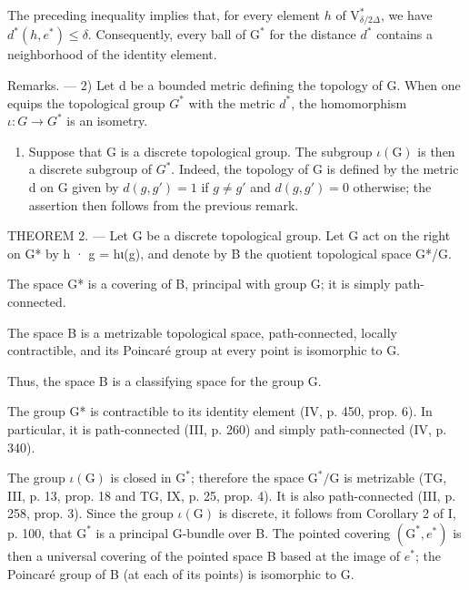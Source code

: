 The preceding inequality implies that, for every element \(h\) of \(\mathrm{V}_{\delta/2\Delta}^{*}\), we have \(d^{*}(h,e^{*})\leqslant\delta\). Consequently, every ball of \(\mathrm{G}^{*}\) for the distance \(d^{*}\) contains a neighborhood of the identity element.

Remarks. --- 2) Let d be a bounded metric defining the topology of G. When one equips the topological group \(G^{*}\) with the metric \(d^{*}\), the homomorphism \(\iota: G \to G^{*}\) is an isometry.

\begin{enumerate}
\def\labelenumi{\arabic{enumi})}
\setcounter{enumi}{2}
\tightlist
\item
  Suppose that G is a discrete topological group. The subgroup \(\iota(\mathrm{G})\) is then a discrete subgroup of \(G^{*}\). Indeed, the topology of G is defined by the metric d on G given by \(d(g,g') = 1\) if \(g \neq g'\) and \(d(g, g') = 0\) otherwise; the assertion then follows from the previous remark.
\end{enumerate}

THEOREM 2. --- Let G be a discrete topological group. Let G act on the right on G* by h · g = hι(g), and denote by B the quotient topological space G*/G.

The space G* is a covering of B, principal with group G; it is simply path-connected.

The space B is a metrizable topological space, path-connected, locally contractible, and its Poincaré group at every point is isomorphic to G.

Thus, the space B is a classifying space for the group G.

The group G* is contractible to its identity element (IV, p. 450, prop. 6). In particular, it is path-connected (III, p. 260) and simply path-connected (IV, p. 340).

The group \(\iota(\mathrm{G})\) is closed in \(\mathrm{G}^*\); therefore the space \(\mathrm{G}^*/\mathrm{G}\) is metrizable (TG, III, p. 13, prop. 18 and TG, IX, p. 25, prop. 4). It is also path-connected (III, p. 258, prop. 3). Since the group \(\iota(\mathrm{G})\) is discrete, it follows from Corollary 2 of I, p. 100, that \(\mathrm{G}^*\) is a principal G-bundle over B. The pointed covering \((\mathrm{G}^*, e^*)\) is then a universal covering of the pointed space B based at the image of \(e^*\); the Poincaré group of B (at each of its points) is isomorphic to G.

